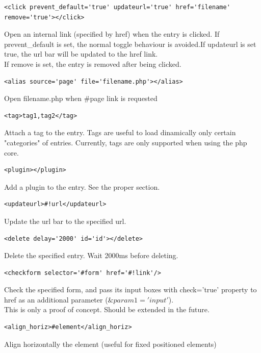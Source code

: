 \documentclass[a4paper,12pt]{article}
\begin{document}
\begin{list}{-}{}
\item \begin{verbatim}
<click prevent_default='true' updateurl='true' href='filename' remove='true'></click>
\end{verbatim}
Open an internal link (specified by href) when the entry is clicked. If prevent\_default is set, the normal toggle behaviour is avoided.If updateurl is set true, the url bar will be updated to the href link.\\
If remove is set, the entry is removed after being clicked.
\item \begin{verbatim}
<alias source='page' file='filename.php'></alias>
\end{verbatim}
Open filename.php when \#page link is requested
\item \begin{verbatim}
<tag>tag1,tag2</tag>
\end{verbatim}
Attach a tag to the entry. Tags are useful to load dinamically only certain "categories" of entries. Currently, tags are only supported when using the php core.
\item \begin{verbatim}
<plugin></plugin>
\end{verbatim}
Add a plugin to the entry. See the proper section.
\item \begin{verbatim}
<updateurl>#!url</updateurl>
\end{verbatim}
Update the url bar to the specified url.
\item \begin{verbatim}
<delete delay='2000' id='id'></delete>
\end{verbatim}
Delete the specified entry. Wait 2000ms before deleting.
\item \begin{verbatim}
<checkform selector='#form' href='#!link'/>
\end{verbatim}
Check the specified form, and pass its input boxes with check='true' property to href as an additional parameter ($\&param1='input'$).\\
This is only a proof of concept. Should be extended in the future.
\item \begin{verbatim}
<align_horiz>#element</align_horiz>
\end{verbatim}
Align horizontally the element (useful for fixed positioned elements)
\end{list}
\normalsize
\end{document}

